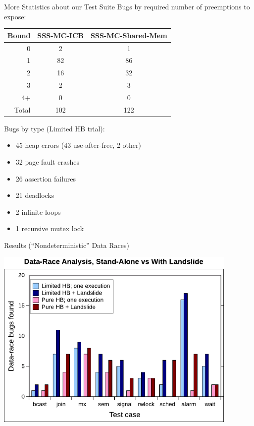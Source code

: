 \documentclass[xcolor=dvipsnames]{beamer}
\begin{document}
\begin{frame}{More Statistics about our Test Suite}
	Bugs by required number of preemptions to expose:
	\begin{center}
        	\footnotesize
        \begin{tabular}{r|c|c}
                {\bf Bound} & {\bf SSS-MC-ICB} & {\bf SSS-MC-Shared-Mem} \\
                \hline
                0       & 2     & 1     \\  
                1       & 82    & 86    \\  
                2       & 16        & 32    \\  
                3       & 2     & 3     \\  
                4+      & 0     & 0     \\  
                \hline
                Total   & 102       & 122   \\  
        \end{tabular}
	\end{center}
	\linegap
	
	Bugs by type (Limited HB trial):
	\begin{itemize}
		\item 45 heap errors (43 use-after-free, 2 other)
		\item 32 page fault crashes %
		\item 26 assertion failures %
		\item 21 deadlocks
		\item 2 infinite loops
		\item 1 recursive mutex lock
	\end{itemize}
\end{frame}

\begin{frame}{Results (``Nondeterministic'' Data Races)}
	\begin{center}
		\vspace{-0.8em}
	\includegraphics[width=0.88\textwidth]{dr-false-negatives-poster.pdf}
	\end{center}
\end{frame}
\end{document}

